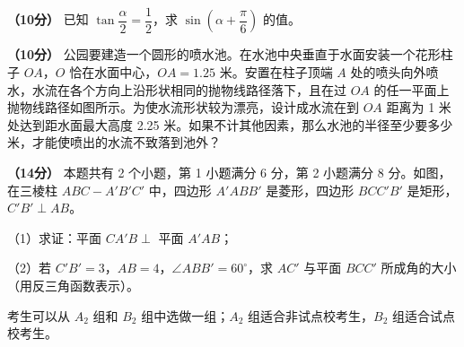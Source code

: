 \begin{question}
\textbf{（10分）} 已知 $\tan\dfrac\alpha2=\dfrac12$，求 $\sin\left(\alpha+\dfrac\pi6\right)$ 的值。

\Needspace{0.4\textheight}
\end{question}
\begin{question}
\textbf{（10分）} 公园要建造一个圆形的喷水池。在水池中央垂直于水面安装一个花形柱子 $OA$，$O$ 恰在水面中心，$OA=1.25$ 米。安置在柱子顶端 $A$ 处的喷头向外喷水，水流在各个方向上沿形状相同的抛物线路径落下，且在过 $OA$ 的任一平面上抛物线路径如图所示。为使水流形状较为漂亮，设计成水流在到 $OA$ 距离为 1 米处达到距水面最大高度 2.25 米。如果不计其他因素，那么水池的半径至少要多少米，才能使喷出的水流不致落到池外？
\nopagebreak[4]
\begin{center}\end{center}
\nopagebreak[4]
\Needspace{0.4\textheight}
\end{question}
\begin{question}
\textbf{（14分）} 本题共有 2 个小题，第 1 小题满分 6 分，第 2 小题满分 8 分。如图，在三棱柱 $ABC-A'B'C'$ 中，四边形 $A'ABB'$ 是菱形，四边形 $BCC'B'$ 是矩形，$C'B'\perp AB$。

（1）求证：平面 $CA'B\perp$ 平面 $A'AB$；

（2）若 $C'B'=3$，$AB=4$，$\angle ABB'=60^\circ$，求 $AC'$ 与平面 $BCC'$ 所成角的大小（用反三角函数表示）。
\nopagebreak[4]
\begin{center}\end{center}
\nopagebreak[4]
\end{question}

考生可以从 $A_2$ 组和 $B_2$ 组中选做一组；$A_2$ 组适合非试点校考生，$B_2$ 组适合试点校考生。

